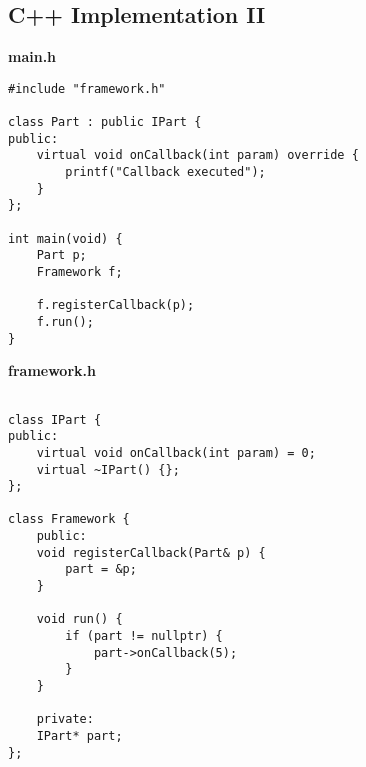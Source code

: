 \subsection{C++ Implementation II}
\textbf{main.h}
\begin{lstlisting}
#include "framework.h"

class Part : public IPart {
public: 
	virtual void onCallback(int param) override {
		printf("Callback executed");
	}
};

int main(void) {
	Part p;
	Framework f;
	
	f.registerCallback(p);
	f.run();
}
\end{lstlisting}

\textbf{framework.h}
\begin{lstlisting}

class IPart {
public:
	virtual void onCallback(int param) = 0;
	virtual ~IPart() {};	
};

class Framework {
	public:
	void registerCallback(Part& p) {
		part = &p;
	}
	
	void run() {
		if (part != nullptr) {
			part->onCallback(5);
		}
	}
	
	private:
	IPart* part;
};
\end{lstlisting}